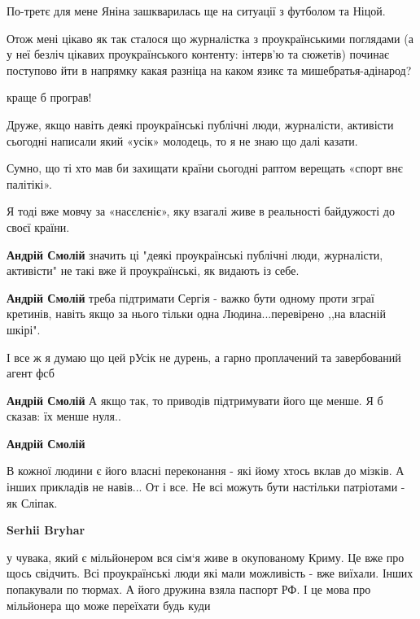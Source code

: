 \begin{itemize}
\begin{itemize}
По-третє для мене Яніна зашкварилась ще на ситуації з футболом та Ніцой.

Отож мені цікаво як так сталося що журналістка з проукраїнськими поглядами (а у
неї безліч цікавих проукраїнського контенту: інтерв'ю та сюжетів) починає
поступово йти в напрямку какая разніца на каком язикє та мишебратья-адінарод?

\end{itemize} %

краще б програв!


Друже, якщо навіть деякі проукраїнські публічні люди, журналісти, активісти
сьогодні написали який «усік» молодець, то я не знаю що далі казати.

Сумно, що ті хто мав би захищати країни сьогодні раптом верещать «спорт внє
палітікі».

Я тоді вже мовчу за «насєлєніє», яку взагалі живе в реальності байдужості до
своєї країни.

\begin{itemize} %
\textbf{Андрій Смолій} значить ці "деякі проукраїнські публічні люди, журналісти, активісти" не такі вже й проукраїнські, як видають із себе.

\textbf{Андрій Смолій} треба підтримати Сергія - важко бути одному проти зграї кретинів, навіть якщо за нього тільки одна Людина...перевірено ,,на власній шкірі".
\end{itemize} %


І все ж я думаю що цей рУсік не дурень, а гарно проплачений та завербований агент фсб

\begin{itemize} %
\textbf{Андрій Смолій} А якщо так, то приводів підтримувати його ще менше. Я б сказав: їх менше нуля..

\textbf{Андрій Смолій} 

В кожної людини є його власні переконання - які йому хтось вклав до мізків. А
інших прикладів не навів... От і все. Не всі можуть бути настільки патріотами -
як Сліпак.



\textbf{Serhii Bryhar} 

у чувака, який є мільйонером вся сім‘я живе в окупованому Криму. Це вже про
щось свідчить. Всі проукраїнські люди які мали можливість - вже виїхали. Інших
попакували по тюрмах. А його дружина взяла паспорт РФ. І це мова про мільйонера
що може переїхати будь куди


\end{itemize}
\end{itemize}
